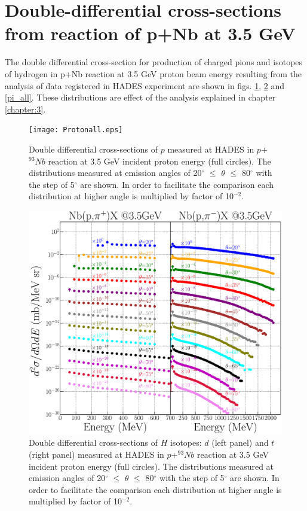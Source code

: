\section{Double-differential cross-sections from reaction of p+Nb at 3.5 GeV}

The double differential cross-section for production of charged pions and isotopes of hydrogen in p+Nb reaction at 3.5 GeV proton beam energy resulting from the analysis of data registered in HADES experiment are shown in figs. \ref{Protonall}, \ref{pdt_all} and \ref{pi_all}. These distributions are effect of the analysis explained in chapter \ref{chapter:3}.

\begin{figure}[!hbt]
\centering
	\texttt{[image: Protonall.eps]}
	\caption{Double differential cross-sections of $p$  measured at HADES 
		in $p$+$^{93}Nb$ reaction at 3.5 GeV incident proton energy (full circles).
		The distributions measured at emission angles of 20$^{\circ}$ $\le$ $\theta$ $\le$ 80$^{\circ}$ with the step of 5$^{\circ}$ are shown.
		In order to facilitate the comparison each distribution at higher angle is multiplied by factor of 10$^{-2}$. }
	\label{Protonall}
\end{figure}
\begin{figure}[!hbt]
\centering
		\includegraphics[width=\textwidth] {Deuteronall.eps}
	\caption{\label{pdt_all}
	Double differential cross-sections of $H$ isotopes: $d$ (left panel) and $t$ (right panel) measured at HADES 
		in $p$+$^{93}Nb$ reaction at 3.5 GeV incident proton energy (full circles).
		The distributions measured at emission angles of 20$^{\circ}$ $\le$ $\theta$ $\le$ 80$^{\circ}$ with the step of 5$^{\circ}$ are shown.
		In order to facilitate the comparison each distribution at higher angle is multiplied by factor of 10$^{-2}$.
	}
\end{figure}
